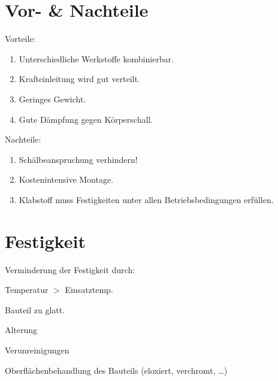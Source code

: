 
\section{Vor- \& Nachteile} %
	Vorteile:
	\begin{enumerate}
		\item Unterschiedliche Werkstoffe kombinierbar.
		\item Krafteinleitung wird gut verteilt.
		\item Geringes Gewicht.
		\item Gute Dämpfung gegen Körperschall.
	\end{enumerate}
	Nachteile:
	\begin{enumerate}
		\item Schälbeanspruchung verhindern!
		\item Kostenintensive Montage.
		\item Klabstoff muss Festigkeiten unter allen Betriebsbedingungen erfüllen.
	\end{enumerate}
\section{Festigkeit} %
	Verminderung der Festigkeit durch:
	\begin{tightitemize}
		\item Temperatur $>$ Einsatztemp.
		\item Bauteil zu glatt.
		\item Alterung
		\item Verunreinigungen
		\item Oberflächenbehandlung des Bauteils (eloxiert, verchromt, \dots)
	\end{tightitemize}
